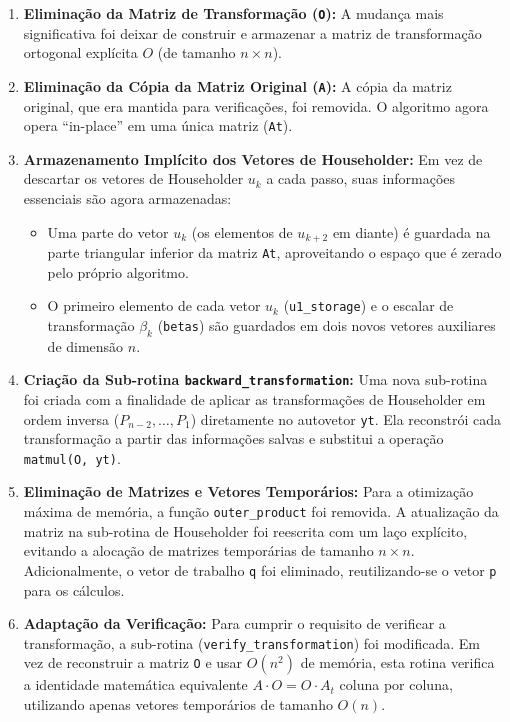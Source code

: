 \documentclass[12pt, a4paper]{article} %
\begin{document}
        \begin{enumerate}
            \item \textbf{Elimina\c{c}\~ao da Matriz de Transforma\c{c}\~ao (\texttt{O}):} A mudan\c{c}a mais significativa foi deixar de construir e armazenar a matriz de transforma\c{c}\~ao ortogonal expl\'icita $O$ (de tamanho $n \times n$).

            \item \textbf{Elimina\c{c}\~ao da C\'opia da Matriz Original (\texttt{A}):} A c\'opia da matriz original, que era mantida para verifica\c{c}\~oes, foi removida. O algoritmo agora opera ``in-place'' em uma \'unica matriz (\texttt{At}).

            \item \textbf{Armazenamento Impl\'icito dos Vetores de Householder:} Em vez de descartar os vetores de Householder $u_k$ a cada passo, suas informa\c{c}\~oes essenciais s\~ao agora armazenadas:
            \begin{itemize}
                \item Uma parte do vetor $u_k$ (os elementos de $u_{k+2}$ em diante) \'e guardada na parte triangular inferior da matriz \texttt{At}, aproveitando o espa\c{c}o que \'e zerado pelo pr\'oprio algoritmo.
                \item O primeiro elemento de cada vetor $u_k$ (\texttt{u1\_storage}) e o escalar de transforma\c{c}\~ao $\beta_k$ (\texttt{betas}) s\~ao guardados em dois novos vetores auxiliares de dimens\~ao $n$.
            \end{itemize}

            \item \textbf{Cria\c{c}\~ao da Sub-rotina \texttt{backward\_transformation}:} Uma nova sub-rotina foi criada com a finalidade de aplicar as transforma\c{c}\~oes de Householder em ordem inversa ($P_{n-2}, \dots, P_1$) diretamente no autovetor \texttt{yt}. Ela reconstr\'oi cada transforma\c{c}\~ao a partir das informa\c{c}\~oes salvas e substitui a opera\c{c}\~ao \texttt{matmul(O, yt)}.
            
            \item \textbf{Elimina\c{c}\~ao de Matrizes e Vetores Tempor\'arios:} Para a otimiza\c{c}\~ao m\'axima de mem\'oria, a fun\c{c}\~ao \texttt{outer\_product} foi removida. A atualiza\c{c}\~ao da matriz na sub-rotina de Householder foi reescrita com um la\c{c}o expl\'icito, evitando a aloca\c{c}\~ao de matrizes tempor\'arias de tamanho $n \times n$. Adicionalmente, o vetor de trabalho \texttt{q} foi eliminado, reutilizando-se o vetor \texttt{p} para os c\'alculos.
            
            \item \textbf{Adapta\c{c}\~ao da Verifica\c{c}\~ao:} Para cumprir o requisito de verificar a transforma\c{c}\~ao, a sub-rotina (\texttt{verify\_transformation}) foi modificada. Em vez de reconstruir a matriz \texttt{O} e usar $O(n^2)$ de mem\'oria, esta rotina verifica a identidade matem\'atica equivalente $A \cdot O = O \cdot A_t$ coluna por coluna, utilizando apenas vetores tempor\'arios de tamanho $O(n)$.

        \end{enumerate}
\end{document}
